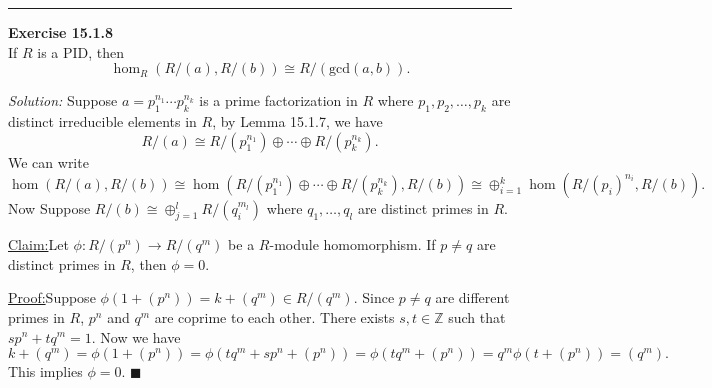 \documentclass[a4paper, 12pt]{article}
\newenvironment{problem}[2][Exercise]
    { \begin{mdframed}[backgroundcolor=gray!20] \textbf{#1 #2} \\}
    {  \end{mdframed}}
\newenvironment{solution}
    {\textit{Solution:}}
    {}
\newenvironment{claim}[1]{\par\noindent\underline{Claim:}\space#1}{}
\newenvironment{claimproof}[1]{\par\noindent\underline{Proof:}\space#1}{\hfill $\blacksquare$}
\begin{document}
\noindent\rule{7in}{2.8pt}
\newpage 
\begin{problem}{15.1.8}
If \(R\) is a PID, then 
\[\hom_R(R/(a),R/(b))\cong R/(\text{gcd}(a,b)).\]
\end{problem}
\begin{solution}
Suppose \(a=p_1^{n_1}\cdots p_k^{n_k}\) is a prime factorization in \(R\) where \(p_1,p_2,\ldots,p_k\) are distinct irreducible elements in \(R\), by Lemma 15.1.7, we have 
\[R/(a)\cong R/(p_1^{n_1})\oplus \cdots \oplus R/(p_k^{n_k}).\]
We can write 
\[\hom (R/(a),R/(b))\cong \hom (R/(p_1^{n_1})\oplus \cdots\oplus R/(p_k^{n_k}), R/(b))\cong \oplus_{i=1}^k\hom (R/(p_i)^{n_i},R/(b)).\]
Now Suppose \(R/(b)\cong \oplus_{j=1}^l R/(q_i^{m_l})\) where \(q_1,\ldots,q_l\) are distinct primes in \(R\). 
\begin{claim}
Let \(\phi:R/(p^n)\rightarrow R/(q^m)\) be a \(R\)-module homomorphism. If \(p\neq q\) are distinct primes in \(R\), then \(\phi=0\).
\end{claim}
\begin{claimproof}
Suppose \(\phi(1+(p^n))=k+(q^m)\in R/(q^m)\). Since \(p\neq q\) are different primes in \(R\), \(p^n\) and \(q^m\) are coprime to each other. There exists \(s,t\in \mathbb{Z}\) such that 
\(sp^n+tq^m=1\). Now we have 
\[k+(q^m)=\phi(1+(p^n))=\phi(tq^m+sp^n+(p^n))=\phi(tq^m+(p^n))=q^m\phi(t+(p^n))=(q^m).\]
This implies \(\phi=0\). 
\end{claimproof}


\end{solution}
\end{document}
